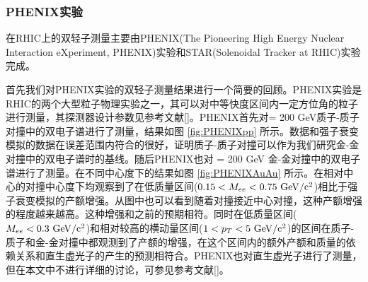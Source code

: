 \subsubsection{PHENIX实验}

在RHIC上的双轻子测量主要由PHENIX(The Pioneering High Energy Nuclear Interaction eXperiment, PHENIX)实验和STAR(Solenoidal Tracker at RHIC)实验完成。

首先我们对PHENIX实验的双轻子测量结果进行一个简要的回顾。PHENIX实验是RHIC的两个大型粒子物理实验之一，其可以对中等快度区间内一定方位角的粒子进行测量，其探测器设计参数见参考文献[]。PHENIX首先对\sNN = 200 GeV质子-质子对撞中的双电子谱进行了测量，结果如图 \ref{fig:PHENIXpp} 所示。数据和强子衰变模拟的数据在误差范围内符合的很好，证明质子-质子对撞可以作为我们研究金-金对撞中的双电子谱时的基线。随后PHENIX也对 \sNN = 200 GeV 金-金对撞中的双电子谱进行了测量。在不同中心度下的结果如图 \ref{fig:PHENIXAuAu} 所示。在相对中心的对撞中心度下均观察到了在低质量区间($ 0.15 < M_{ee} < 0.75~{\rm GeV/c^2}$)相比于强子衰变模拟的产额增强。从图中也可以看到随着对撞接近中心对撞，这种产额增强的程度越来越高。这种增强和之前的预期相符。同时在低质量区间($M_{ee} < 0.3~{\rm GeV/c^2}$)和相对较高的横动量区间($ 1 < p_T < 5 ~{\rm GeV/c^2}$)的区间在质子-质子和金-金对撞中都观测到了产额的增强，在这个区间内的额外产额和质量的依赖关系和直生虚光子的产生的预测相符合。PHENIX也对直生虚光子进行了测量，但在本文中不进行详细的讨论，可参见参考文献[]。

